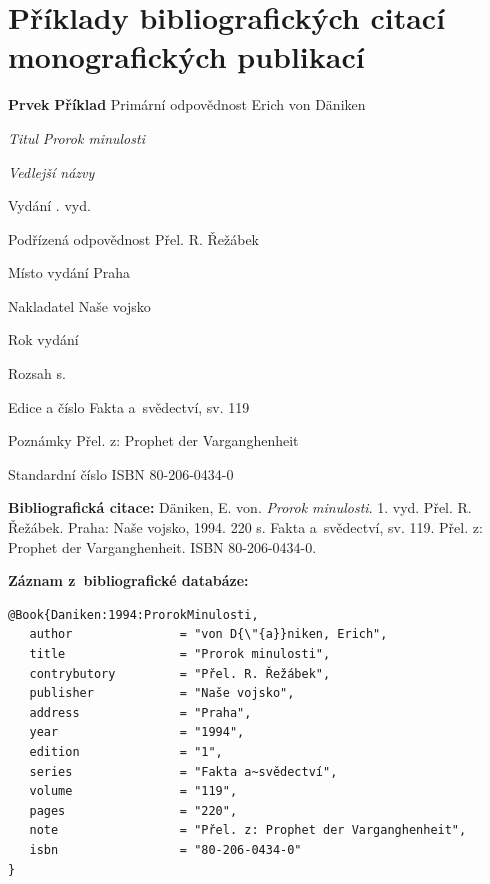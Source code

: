 \section*{Příklady bibliografických citací monografických publikací}
\label{pr-monografie1}
\begin{tabbing} 
\zarazky
\textbf{Prvek} \> \textbf{Příklad} \odradkovani
Primární odpovědnost \>
Erich von {\sc D{\"a}niken}

\odradkovani
{\em Titul} \>
{\em Prorok minulosti}

\odradkovani
{\em Vedlejší názvy}\footnotemark[1]

\odradkovani
Vydání . vyd.

\odradkovani
Podřízená odpovědnost\footnotemark[1] \>
Přel. R. Řežábek

\odradkovani
Místo vydání \>
Praha

\odradkovani
Nakladatel \>
Naše vojsko

\odradkovani
Rok vydání 

\odradkovani
Rozsah\footnotemark[1]  s.

\odradkovani
Edice a číslo \>
Fakta a~svědectví, sv. 119

\odradkovani
Poznámky\footnotemark[2] \>
Přel. z: Prophet der Varganghenheit

\odradkovani
Standardní číslo \>
ISBN 80-206-0434-0

\odradkovani
\end{tabbing}

\noindent \textbf{Bibliografická citace:} \odradkovani
{\sc D{\"a}niken}, E. von. {\em Prorok minulosti}. 1. vyd. Přel. R. Řežábek.
Praha: Naše vojsko, 1994. 220 s. Fakta a~svědectví, sv. 119.
Přel. z: Prophet der Varganghenheit. ISBN 80-206-0434-0.

\bigskip \bigskip
\noindent \textbf{Záznam z~bibliografické databáze:}
\vspace{-0.5em}
\begin{verbatim}
@Book{Daniken:1994:ProrokMinulosti,
   author               = "von D{\"{a}}niken, Erich",
   title                = "Prorok minulosti",
   contrybutory         = "Přel. R. Řežábek",
   publisher            = "Naše vojsko",
   address              = "Praha",
   year                 = "1994",
   edition              = "1",
   series               = "Fakta a~svědectví",
   volume               = "119",
   pages                = "220",
   note                 = "Přel. z: Prophet der Varganghenheit",
   isbn                 = "80-206-0434-0"
}
\end{verbatim}

